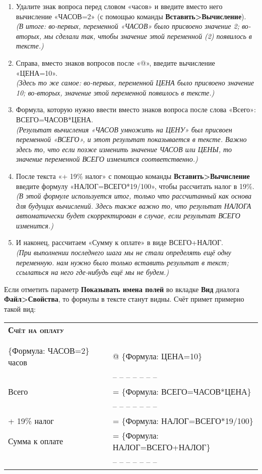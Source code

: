 ﻿\documentclass[a4paper,10pt]{article}
\begin{document}
\begin{enumerate}
 \item Удалите знак вопроса перед словом «часов» и введите вместо него вычисление «ЧАСОВ=2» (с помощью команды \textbf{Вставить>Вычисление}).\\
 \textit{(В итоге: во-первых, переменной «ЧАСОВ» было присвоено значение 2; во-вторых, мы сделали так, чтобы значение этой переменной (2) появилось в тексте.)}
 \item Справа, вместо знаков вопросов после «@», введите вычисление «ЦЕНА=10».\\
 \textit{(Здесь то же самое: во-первых, переменной ЦЕНА было присвоено значение 10; во-вторых, значение этой переменной появилось в тексте.)}
 \item Формула, которую нужно ввести вместо знаков вопроса после слова «Всего»: ВСЕГО=ЧАСОВ*ЦЕНА.\\
 \textit{(Результат вычисления «ЧАСОВ умножить на ЦЕНУ» был присвоен переменной «ВСЕГО», и этот результат показывается в тексте. Важно здесь то, что если позже изменить значение ЧАСОВ или ЦЕНЫ, то значение переменной ВСЕГО изменится соответственно.)}
 \item После текста «+ 19\% налог» с помощью команды \textbf{Вставить>Вычисление} введите формулу «НАЛОГ=ВСЕГО*19/100», чтобы рассчитать налог в 19\%.\\
 \textit{(В этой формуле используется итог, только что рассчитанный как основа для будущих вычислений. Здесь также важно то, что результат НАЛОГА автоматически будет скорректирован в случае, если результат ВСЕГО изменится.)}
 \item И наконец, рассчитаем «Сумму к оплате» в виде ВСЕГО+НАЛОГ.\\
 \textit{(При выполнении последнего шага мы не стали определять ещё одну переменную. нам нужно было только вставить результат в текст; ссылаться на него где-нибудь ещё мы не будем.)}
\end{enumerate}

Если отметить параметр \textbf{Показывать имена полей} во вкладке \textbf{Вид} диалога \textbf{Файл>Свойства}, то формулы в тексте станут видны. Счёт примет примерно такой вид:

\begin{center}
\begin{tabular}{ | m{5cm}  m{8cm} | }
 \hline
 \textbf{\textsc{Счёт на оплату}} & \\ 
 & \\
 & \\
  \{Формула: ЧАСОВ=2\} часов & @ \{Формула: ЦЕНА=10\}\\
  & -- -- -- -- -- -- --\\
  Всего & = \{Формула: ВСЕГО=ЧАСОВ*ЦЕНА\}\\
  & -- -- -- -- -- -- --\\
+ 19\% налог & = \{Формула: НАЛОГ=ВСЕГО*19/100\}\\
Сумма к оплате & = \{Формула: НАЛОГ=ВСЕГО+НАЛОГ\}\\
  & -- -- -- -- -- -- --\\
  \hline
\end{tabular}
\end{center}
\end{document}
